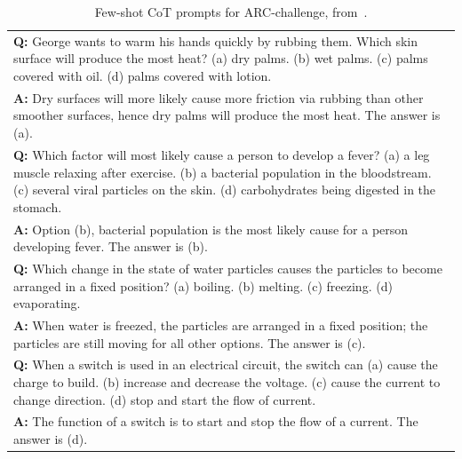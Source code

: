 \documentclass{article} %
\begin{document}
\begin{table}[h]
    \caption{
    Few-shot CoT prompts for ARC-challenge, from~\cite{Wang2022SelfConsistencyIC}.
    }
    \centering
    \small
    \begin{tabular}{p{13.5cm}}
        \toprule
        \textbf{Q:} George wants to warm his hands quickly by rubbing them. Which skin surface will produce the most heat? (a) dry palms. (b) wet palms. (c) palms covered with oil. (d) palms covered with lotion.\\
        \vspace{-1mm}
        \textbf{A:} Dry surfaces will more likely cause more friction via rubbing than other smoother surfaces, hence dry palms will produce the most heat. The answer is (a).\\
        \vspace{0mm}
        \textbf{Q:} Which factor will most likely cause a person to develop a fever? (a) a leg muscle relaxing after exercise. (b) a bacterial population in the bloodstream. (c) several viral particles on the skin. (d) carbohydrates being digested in the stomach.\\
        \vspace{-1mm}
        \textbf{A:} Option (b), bacterial population is the most likely cause for a person developing fever. The answer is (b). \\
        \vspace{0mm}
        \textbf{Q:} Which change in the state of water particles causes the particles to become arranged in a fixed position? (a) boiling. (b) melting. (c) freezing. (d) evaporating.\\
        \vspace{-1mm}
        \textbf{A:} When water is freezed, the particles are arranged in a fixed position; the particles are still moving for all other options. The answer is (c).\\
        \vspace{0mm}
        \textbf{Q:} When a switch is used in an electrical circuit, the switch can (a) cause the charge to build. (b) increase and decrease the voltage. (c) cause the current to change direction. (d) stop and start the flow of current.\\
        \vspace{-1mm}
        \textbf{A:} The function of a switch is to start and stop the flow of a current. The answer is (d).\\
        \bottomrule
    \end{tabular}
    \label{tab:prompt-arc}
\end{table}
\end{document}
